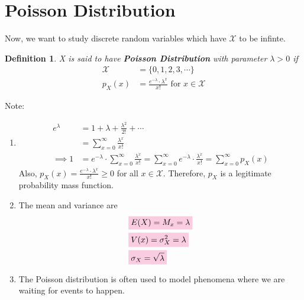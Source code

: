 \documentclass[11pt,oneside]{book}
\theoremstyle{newStyle}
\newtheorem{defn}[thm]{Definition}
\newcommand{\X}{\mathcal{X}}
\newcommand{\note}{\color{red}Note: \color{black}}
\begin{document}
\section[Poisson Distribution]{Poisson Distribution}
Now, we want to study discrete random variables which have $\X$ to be infinte. \begin{defn}
X is said to have \textbf{Poisson Distribution} with parameter $\lambda >0$ if \begin{align*}
\X&=\{0,1,2,3,\cdots\}\\
p_X(x)&=\frac{e^{-\lambda}\cdot \lambda^x}{x!}\text{ for }x\in \X
\end{align*}
\end{defn} 
\note \begin{enumerate}
\item \begin{align*}
e^{\lambda}&=1+\lambda+\frac{\lambda^2}{2!}+\cdots\\
&=\sum_{x=0}^{\infty}\frac{\lambda^x}{x!}\\
\implies 1&=e^{-\lambda}\cdot \sum_{x=0}^{\infty}\frac{\lambda^x}{x!}=\sum_{x=0}^{\infty}e^{-\lambda}\cdot\frac{\lambda^x}{x!}=\sum_{x=0}^{\infty}p_X(x)
\end{align*}
Also, $p_X(x)=\frac{e^{-\lambda}\cdot \lambda^x}{x!}\geq 0$ for all $x\in \X$. Therefore, $p_X$ is a legitimate probability mass function. 
\item The mean and variance are\begin{align*}
&\text{\colorbox{pink}{$E(X)=M_x=\lambda$}}\\
&\text{\colorbox{pink}{$V(x)=\sigma_X^2=\lambda$}}\\
&\text{\colorbox{pink}{$\sigma_X=\sqrt{\lambda}$}}
\end{align*}
\item The Poisson distribution is often used to model phenomena where we are waiting for events to happen.
\end{enumerate}
\end{document}
